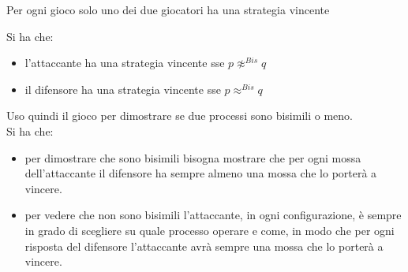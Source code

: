 \begin{definizione}
  Per ogni gioco solo uno dei due giocatori ha una strategia vincente
\end{definizione}
\begin{definizione}
  Si ha che:
  \begin{itemize}
    \item l'attaccante ha una strategia vincente sse $p\not\approx^{Bis}q$
    \item il difensore ha una strategia vincente sse $p\approx^{Bis}q$
  \end{itemize}
\end{definizione}
Uso quindi il gioco per dimostrare se due processi sono bisimili o meno.\\
Si ha che:
\begin{itemize}
  \item per dimostrare che sono bisimili bisogna mostrare che per ogni mossa
  dell'attaccante il difensore ha sempre almeno una mossa che lo porterà a
  vincere.
  
  \item per vedere che non sono bisimili l'attaccante, in ogni configurazione, è
  sempre in grado di scegliere su quale processo operare e come, in modo che per
  ogni risposta del difensore l'attaccante avrà sempre una mossa che lo porterà
  a vincere. 
\end{itemize}

